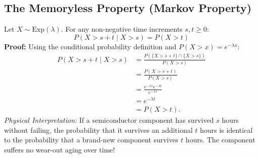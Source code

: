 \documentclass[12pt,a4paper]{article}
\begin{document}
\subsection{The Memoryless Property (Markov Property)}
\begin{tcolorbox}[examplebox, title={\textbf{Theorem: Memoryless Property of the Exponential Distribution}}]
Let $X \sim \text{Exp}(\lambda)$. For any non-negative time increments $s, t \ge 0$:
\begin{equation}
  P(X > s + t \mid X > s) = P(X > t)
\end{equation}
\textbf{Proof:} Using the conditional probability definition and $P(X > x) = e^{-\lambda x}$:
\begin{align}
  P(X > s + t \mid X > s) &= \frac{P(\{X > s + t\} \cap \{X > s\})}{P(X > s)} \nonumber \\[4pt]
                          &= \frac{P(X > s+t)}{P(X>s)} \nonumber \\
                          &= \frac{e^{-\lambda s}e^{-\lambda t}}{e^{-\lambda s}} \nonumber \\
                          &= e^{-\lambda t} \nonumber \\
                          &= P(X>t).
\end{align}
\textit{Physical Interpretation:} If a semiconductor component has survived $s$ hours without failing, the probability that it survives an additional $t$ hours is identical to the probability that a brand-new component survives $t$ hours. The component suffers no wear-out aging over time!
\end{tcolorbox}
\end{document}
